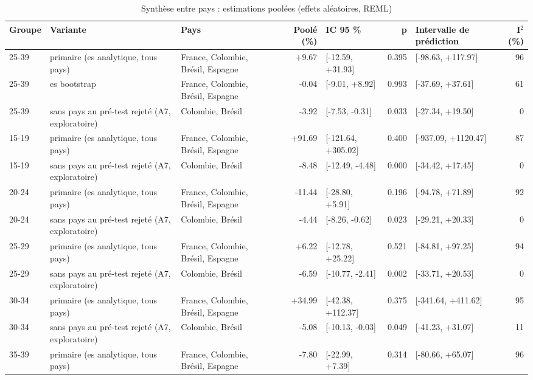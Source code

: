 \begin{table}[htbp]\centering
\begin{threeparttable}
\caption{Synthèse entre pays : estimations poolées (effets aléatoires, REML)}\label{tab:meta}
\footnotesize
\begin{tabular}{p{1.4cm}p{2.4cm}p{2.6cm}rp{2.3cm}rp{2.3cm}r}
\toprule
Groupe & Variante & Pays & Poolé (\%) & IC 95 \% & p & Intervalle de prédiction & I$^2$ (\%) \\
\midrule
25-39 & primaire (es analytique, tous pays) & France, Colombie, Brésil, Espagne & +9.67 & [-12.59, +31.93] & 0.395 & [-98.63, +117.97] & 96 \\
25-39 & es bootstrap & France, Colombie, Brésil, Espagne & -0.04 & [-9.01, +8.92] & 0.993 & [-37.69, +37.61] & 61 \\
25-39 & sans pays au pré-test rejeté (A7, exploratoire) & Colombie, Brésil & -3.92 & [-7.53, -0.31] & 0.033 & [-27.34, +19.50] & 0 \\
15-19 & primaire (es analytique, tous pays) & France, Colombie, Brésil, Espagne & +91.69 & [-121.64, +305.02] & 0.400 & [-937.09, +1120.47] & 87 \\
15-19 & sans pays au pré-test rejeté (A7, exploratoire) & Colombie, Brésil & -8.48 & [-12.49, -4.48] & 0.000 & [-34.42, +17.45] & 0 \\
20-24 & primaire (es analytique, tous pays) & France, Colombie, Brésil, Espagne & -11.44 & [-28.80, +5.91] & 0.196 & [-94.78, +71.89] & 92 \\
20-24 & sans pays au pré-test rejeté (A7, exploratoire) & Colombie, Brésil & -4.44 & [-8.26, -0.62] & 0.023 & [-29.21, +20.33] & 0 \\
25-29 & primaire (es analytique, tous pays) & France, Colombie, Brésil, Espagne & +6.22 & [-12.78, +25.22] & 0.521 & [-84.81, +97.25] & 94 \\
25-29 & sans pays au pré-test rejeté (A7, exploratoire) & Colombie, Brésil & -6.59 & [-10.77, -2.41] & 0.002 & [-33.71, +20.53] & 0 \\
30-34 & primaire (es analytique, tous pays) & France, Colombie, Brésil, Espagne & +34.99 & [-42.38, +112.37] & 0.375 & [-341.64, +411.62] & 95 \\
30-34 & sans pays au pré-test rejeté (A7, exploratoire) & Colombie, Brésil & -5.08 & [-10.13, -0.03] & 0.049 & [-41.23, +31.07] & 11 \\
35-39 & primaire (es analytique, tous pays) & France, Colombie, Brésil, Espagne & -7.80 & [-22.99, +7.39] & 0.314 & [-80.66, +65.07] & 96 \\

\end{tabular}
\end{threeparttable}
\end{table}
